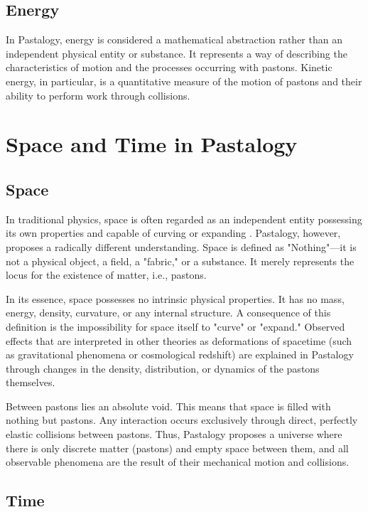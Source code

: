 \documentclass[pdflatex,sn-mathphys-num]{sn-jnl}
\begin{document}
\subsection{Energy}\label{subsec:energy}

In Pastalogy, energy is considered a mathematical abstraction rather than an independent physical entity or substance. It represents a way of describing the characteristics of motion and the processes occurring with pastons. Kinetic energy, in particular, is a quantitative measure of the motion of pastons and their ability to perform work through collisions.

\section{Space and Time in Pastalogy}\label{sec:space-time}

\subsection{Space}\label{subsec:space}

In traditional physics, space is often regarded as an independent entity possessing its own properties and capable of curving or expanding \cite{mtw1973}. Pastalogy, however, proposes a radically different understanding. Space is defined as "Nothing"---it is not a physical object, a field, a "fabric," or a substance. It merely represents the locus for the existence of matter, i.e., pastons.

In its essence, space possesses no intrinsic physical properties. It has no mass, energy, density, curvature, or any internal structure. A consequence of this definition is the impossibility for space itself to "curve" or "expand." Observed effects that are interpreted in other theories as deformations of spacetime (such as gravitational phenomena or cosmological redshift) are explained in Pastalogy through changes in the density, distribution, or dynamics of the pastons themselves.

Between pastons lies an absolute void. This means that space is filled with nothing but pastons. Any interaction occurs exclusively through direct, perfectly elastic collisions between pastons. Thus, Pastalogy proposes a universe where there is only discrete matter (pastons) and empty space between them, and all observable phenomena are the result of their mechanical motion and collisions.

\subsection{Time}\label{subsec:time}
\end{document}

